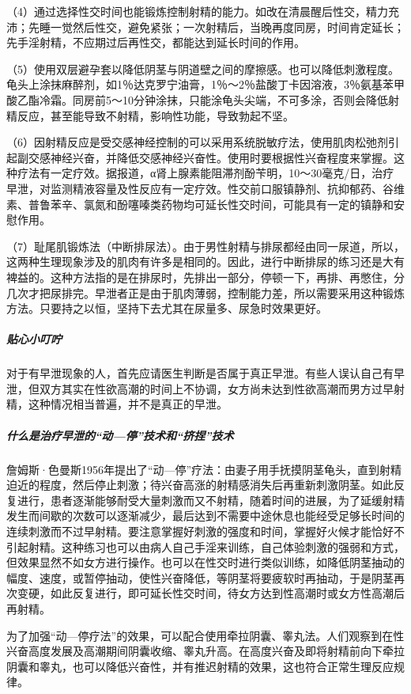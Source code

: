 \begin{enumerate}
（4）通过选择性交时间也能锻炼控制射精的能力。如改在清晨醒后性交，精力充沛；先睡一觉然后性交，避免紧张；一次射精后，当晚再度同房，时间肯定延长；先手淫射精，不应期过后再性交，都能达到延长时间的作用。

（5）使用双层避孕套以降低阴茎与阴道壁之间的摩擦感。也可以降低刺激程度。龟头上涂抹麻醉剂，如1％达克罗宁油膏，1％～2％盐酸丁卡因溶液，3％氨基苯甲酸乙酯冷霜。同房前5～10分钟涂抹，只能涂龟头尖端，不可多涂，否则会降低射精反应，甚至能导致不射精，影响性功能，导致勃起不坚。

（6）因射精反应是受交感神经控制的可以采用系统脱敏疗法，使用肌肉松弛剂引起副交感神经兴奋，并降低交感神经兴奋性。使用时要根据性兴奋程度来掌握。这种疗法有一定疗效。据报道，α肾上腺素能阻滞剂酚苄明，10～30毫克/日，治疗早泄，对监测精液容量及性反应有一定疗效。性交前口服镇静剂、抗抑郁药、谷维素、普鲁苯辛、氯氮和酚噻嗪类药物均可延长性交时间，可能具有一定的镇静和安慰作用。

（7）耻尾肌锻炼法（中断排尿法）。由于男性射精与排尿都经由同一尿道，所以，这两种生理现象涉及的肌肉有许多是相同的。因此，进行中断排尿的练习还是大有裨益的。这种方法指的是在排尿时，先排出一部分，停顿一下，再排、再憋住，分几次才把尿排完。早泄者正是由于肌肉薄弱，控制能力差，所以需要采用这种锻炼方法。只要持之以恒，坚持下去尤其在尿量多、尿急时效果更好。

\subparagraph{贴心小叮咛}

对于有早泄现象的人，首先应请医生判断是否属于真正早泄。有些人误认自己有早泄，但双方其实在性欲高潮的时间上不协调，女方尚未达到性欲高潮而男方过早射精，这种情况相当普遍，并不是真正的早泄。

\subparagraph{什么是治疗早泄的“动—停”技术和“挤捏”技术}

詹姆斯·色曼斯1956年提出了“动—停”疗法：由妻子用手抚摸阴茎龟头，直到射精迫近的程度，然后停止刺激；待兴奋高涨的射精感消失后再重新刺激阴茎。如此反复进行，患者逐渐能够耐受大量刺激而又不射精，随着时间的进展，为了延缓射精发生而间歇的次数可以逐渐减少，最后达到不需要中途休息也能经受足够长时间的连续刺激而不过早射精。要注意掌握好刺激的强度和时间，掌握好火候才能恰好不引起射精。这种练习也可以由病人自己手淫来训练，自己体验刺激的强弱和方式，但效果显然不如女方进行操作。也可以在性交时进行类似训练，如降低阴茎抽动的幅度、速度，或暂停抽动，使性兴奋降低，等阴茎将要疲软时再抽动，于是阴茎再次变硬，如此反复进行，即可延长性交时间，待女方达到性高潮时或女方性高潮后再射精。

为了加强“动—停疗法”的效果，可以配合使用牵拉阴囊、睾丸法。人们观察到在性兴奋高度发展及高潮期间阴囊收缩、睾丸升高。在高度兴奋及即将射精前向下牵拉阴囊和睾丸，也可以降低兴奋性，并有推迟射精的效果，这也符合正常生理反应规律。


\end{enumerate}
